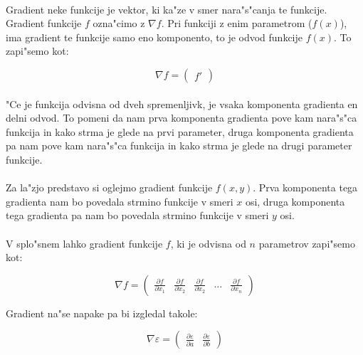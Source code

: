 \paragraph{}
Gradient neke funkcije je vektor, ki ka"ze v smer nara"s"canja te funkcije. Gradient funkcije $f$ ozna"cimo z $\nabla f$. Pri funkciji z enim parametrom ($f(x)$), ima gradient te funkcije samo eno komponento, to je odvod funkcije $f(x)$. To zapi"semo kot:

\[\nabla f = \begin{pmatrix}f'\end{pmatrix} \]

\paragraph{}
"Ce je funkcija odvisna od dveh spremenljivk, je vsaka komponenta gradienta en delni odvod. To pomeni da nam prva komponenta gradienta pove kam nara"s"ca funkcija in kako strma je glede na prvi parameter, druga komponenta gradienta pa nam pove kam nara"s"ca funkcija in kako strma je glede na drugi parameter funkcije.

\paragraph{}
Za la"zjo predstavo si oglejmo gradient funkcije $f(x,y)$. Prva komponenta tega gradienta nam bo povedala strmino funkcije v smeri $x$ osi, druga komponenta tega gradienta pa nam bo povedala strmino funkcije v smeri $y$ osi.

\paragraph{}
V splo"snem lahko gradient funkcije $f$, ki je odvisna od $n$ parametrov zapi"semo kot:

\[\nabla f = \begin{pmatrix}
\frac{\partial f}{\partial x_1} &
\frac{\partial f}{\partial x_2} &
\frac{\partial f}{\partial x_2} &
\dots &
\frac{\partial f}{\partial x_n}
\end{pmatrix} \]

Gradient na"se napake pa bi izgledal takole:

\[\nabla \varepsilon = \begin{pmatrix}
\frac{\partial \varepsilon}{\partial a} &
\frac{\partial \varepsilon}{\partial b}
\end{pmatrix} \]